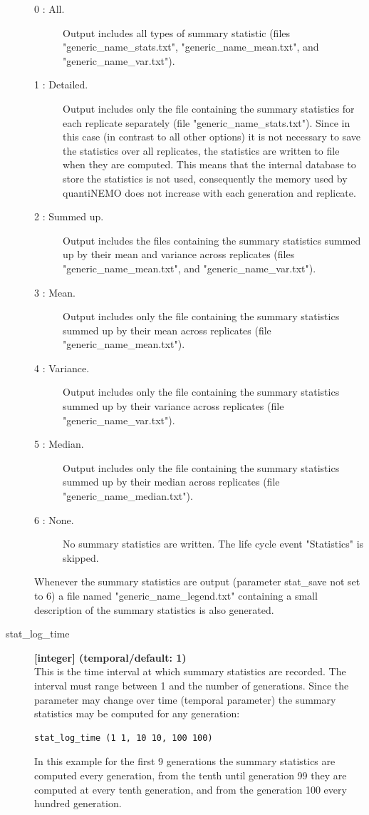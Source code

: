 \documentclass[letterpaper,12pt,oneside]{book}
\begin{document}
\begin{description}
\begin{description}
\item[0 : All.] Output includes all types of summary statistic (files "generic\_name\_stats.txt", "generic\_name\_mean.txt", and "generic\_name\_var.txt").
\item[1 : Detailed.] Output includes only the file containing the summary statistics for each replicate separately (file "generic\_name\_stats.txt"). Since in this case (in contrast to all other options) it is not necessary to save the statistics over all replicates, the statistics are written to file when they are computed. This means that the internal database to store the statistics is not used, consequently the memory used by quantiNEMO does not increase with each generation and replicate.
\item[2 : Summed up.] Output includes the files containing the summary statistics summed up by their mean and variance across replicates (files "generic\_name\_mean.txt", and "generic\_name\_var.txt"). 
\item[3 : Mean.] Output includes only the file containing the summary statistics summed up by their mean across replicates (file "generic\_name\_mean.txt").
\item[4 : Variance.] Output includes only the file containing the summary statistics summed up by their variance across replicates (file "generic\_name\_var.txt").
\item[5 : Median.] Output includes only the file containing the summary statistics summed up by their median across replicates (file "generic\_name\_median.txt").
\item[6 : None.] No summary statistics are written. The life cycle event "Statistics" is skipped.
\end{description}
Whenever the summary statistics are output (parameter \textsf{stat\_save} not set to 6) a file named "generic\_name\_legend.txt" containing a small description of the summary statistics is also generated.
 
\item[stat\_log\_time\index{stat\_log\_time}] \textbf{[integer] (temporal/default: 1)}\\
This is the time interval at which summary statistics are recorded. The interval must range between 1 and the number of generations. Since the parameter may change over time (temporal parameter) the summary statistics may be computed for any generation:
\begin{lstlisting}[frame=single]
stat_log_time (1 1, 10 10, 100 100) 
\end{lstlisting}
In this example for the first 9 generations the summary statistics are computed every generation, from the tenth until generation 99 they are computed at every tenth generation, and from the generation 100 every hundred generation. 


\end{description}
\end{document}
